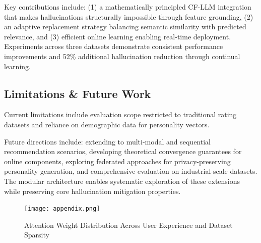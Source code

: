 \documentclass[acmsmall]{acmart}
\begin{document}
Key contributions include: (1) a mathematically principled CF-LLM integration that makes hallucinations structurally impossible through feature grounding, (2) an adaptive replacement strategy balancing semantic similarity with predicted relevance, and (3) efficient online learning enabling real-time deployment. Experiments across three datasets demonstrate consistent performance improvements and 52\% additional hallucination reduction through continual learning.

\subsection{Limitations \& Future Work}
Current limitations include evaluation scope restricted to traditional rating datasets and reliance on demographic data for personality vectors. 

Future directions include: extending to multi-modal and sequential recommendation scenarios, developing theoretical convergence guarantees for online components, exploring federated approaches for privacy-preserving personality generation, and comprehensive evaluation on industrial-scale datasets. The modular architecture enables systematic exploration of these extensions while preserving core hallucination mitigation properties.
\newpage
\appendix

\begin{figure}
    \centering
    \texttt{[image: appendix.png]}
    \caption{Attention Weight Distribution Across User Experience and Dataset Sparsity}
    \label{fig:attention over user experience}
\end{figure}
\end{document}
